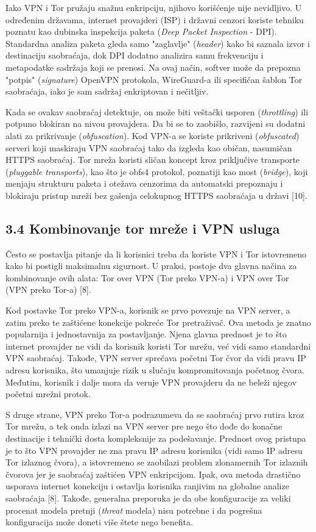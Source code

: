 \documentclass[
]{article}
\begin{document}
Iako VPN i Tor pružaju snažnu enkripciju, njihovo korišćenje nije
nevidljivo. U određenim državama, internet provajderi (ISP) i
državni cenzori koriste tehniku poznatu kao dubinska inspekcija paketa
(\emph{Deep Packet Inspection} - DPI). Standardna analiza paketa gleda
samo "zaglavlje" (\emph{header}) kako bi saznala izvor i destinaciju
saobraćaja, dok DPI dodatno analizira samu frekvenciju i
metapodatke sadržaja koji se prenosi. Na ovaj način, softver može da
prepozna "potpis" (\emph{signature}) OpenVPN protokola, WireGuard-a ili
specifičan šablon Tor saobraćaja, iako je sam sadržaj enkriptovan i
nečitljiv.

Kada se ovakav saobraćaj detektuje, on može biti veštački usporen
(\emph{throttling}) ili potpuno blokiran na nivou provajdera. Da bi se to
zaobišlo, razvijeni su dodatni alati za prikrivanje (\emph{obfuscation}). Kod
VPN-a se koriste prikriveni (\emph{obfuscated}) serveri koji maskiraju VPN saobraćaj tako da
izgleda kao običan, nasumičan HTTPS saobraćaj. Tor mreža koristi sličan
koncept kroz priključive transporte (\emph{pluggable transports}), kao što je obfs4 protokol, poznatiji
kao most (\emph{bridge}), koji menjaju strukturu paketa i otežava cenzorima da
automatski prepoznaju i blokiraju pristup mreži bez gašenja celokupnog
HTTPS saobraćaja u državi [10].

\subsection{3.4 Kombinovanje tor mreže i VPN usluga}
\label{sec:t3.4}

Često se postavlja pitanje da li korisnici treba da koriste VPN i Tor
istovremeno kako bi postigli maksimalnu sigurnost. U praksi, postoje dva
glavna načina za kombinovanje ovih alata: Tor over VPN (Tor preko VPN-a)
i VPN over Tor (VPN preko Tor-a) [8].

Kod postavke Tor preko VPN-a, korisnik se prvo povezuje na VPN server, a
zatim preko te zaštićene konekcije pokreće Tor pretraživač. Ova metoda
je znatno popularnija i jednostavnija za postavljanje. Njena glavna
prednost je to što internet provajder ne vidi da korisnik koristi Tor
mrežu, već vidi samo standardni VPN saobraćaj. Takođe, VPN server
sprečava početni Tor čvor da vidi pravu IP adresu korisnika, što
umanjuje rizik u slučaju kompromitovanja početnog čvora. Međutim,
korisnik i dalje mora da veruje VPN provajderu da ne beleži njegov
početni mrežni protok.

S druge strane, VPN preko Tor-a podrazumeva da se saobraćaj prvo rutira
kroz Tor mrežu, a tek onda izlazi na VPN server pre nego što dođe do
konačne destinacije i tehnički dosta kompleksnije za podešavanje.
Prednost ovog pristupa je to što VPN provajder ne zna pravu IP adresu
korisnika (vidi samo IP adresu Tor izlaznog čvora), a istovremeno se
zaobilazi problem zlonamernih Tor izlaznih čvorova jer je saobraćaj
zaštićen VPN enkripcijom. Ipak, ova metoda drastično usporava internet
konekciju i ostavlja korisnika ranjivim na globalne analize saobraćaja
[8]. Takođe, generalna preporuka je da obe konfiguracije za veliki procenat
modela pretnji (\emph{threat} modela) nisu potrebne i da pogrešna konfiguracija može doneti
više štete nego benefita.
\end{document}
